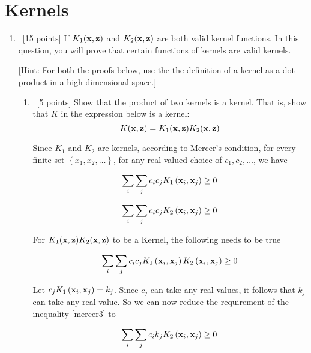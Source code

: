 \section{Kernels}
\label{sec:q2}

\begin{enumerate}  


\item  ~[15 points] If $K_1({\bf x},{\bf z})$ and $K_2({\bf x},{\bf z})$ are both valid kernel
  functions. In this question, you will prove that certain functions
  of kernels are valid kernels. 

  [Hint: For both the proofs below, use the the definition of a kernel
  as a dot product in a high dimensional space.]

\begin{enumerate}
\item ~[5 points] Show that the product of two kernels is a kernel.
  That is, show that $K$ in the expression below is a kernel:
  \begin{equation*}
    K({\bf x},{\bf z}) = K_1({\bf x},{\bf z}) K_2({\bf x},{\bf z})
  \end{equation*} 

Since $K_1$ and $K_2$ are kernels, according to Mercer's condition, for every finite set $\left \{ x_1, x_2, \ldots \right \}$, for any real valued choice of $c_1, c_2, \ldots$, we have

  \begin{equation}
   \sum_i \sum_j c_i c_j K_1 \left ( {\bf x}_i, {\bf x}_j \right ) \geq 0
   \label{mercer1}
  \end{equation} 

  \begin{equation}
   \sum_i \sum_j c_i c_j K_2 \left ( {\bf x}_i, {\bf x}_j \right ) \geq 0
   \label{mercer2}
  \end{equation} 
  
  For $K_1({\bf x},{\bf z}) K_2({\bf x},{\bf z})$ to be a Kernel, the following needs to be true
  
  \begin{equation}
   \sum_i \sum_j c_i c_j K_1 \left ( {\bf x}_i, {\bf x}_j \right ) K_2 \left ( {\bf x}_i, {\bf x}_j \right ) \geq 0
   \label{mercer3}
  \end{equation} 
  
  Let $c_j K_1 \left ( {\bf x}_i, {\bf x}_j \right ) =  k_j$. Since $c_j$ can take any real values, it follows that $k_j$ can take any real value. So we can now reduce the requirement of the inequality \ref{mercer3} to
  
    \begin{equation}
   \sum_i \sum_j c_i k_j K_2 \left ( {\bf x}_i, {\bf x}_j \right ) \geq 0
   \label{mercer4}
  \end{equation} 
  

\end{enumerate}
\end{enumerate}
